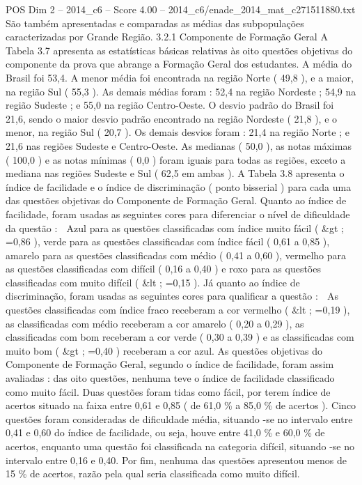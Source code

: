 \begin{textsample}{POS Dim 2 – 2014\_c6 – Score 4.00 – 2014\_c6/enade\_2014\_mat\_c271511880.txt}
São também apresentadas e comparadas as médias das subpopulações caracterizadas por Grande Região. 3.2.1 Componente de Formação Geral A Tabela 3.7 apresenta as estatísticas básicas relativas às oito questões objetivas do componente da prova que abrange a Formação Geral dos estudantes.
A média do Brasil foi 53,4.
A menor média foi encontrada na região Norte ( 49,8 ), e a maior, na região Sul ( 55,3 ).
As demais médias foram : 52,4 na região Nordeste ; 54,9 na região Sudeste ; e 55,0 na região Centro-Oeste.
O desvio padrão do Brasil foi 21,6, sendo o maior desvio padrão encontrado na região Nordeste ( 21,8 ), e o menor, na região Sul ( 20,7 ).
Os demais desvios foram : 21,4 na região Norte ; e 21,6 nas regiões Sudeste e Centro-Oeste.
As medianas ( 50,0 ), as notas máximas ( 100,0 ) e as notas mínimas ( 0,0 ) foram iguais para todas as regiões, exceto a mediana nas regiões Sudeste e Sul ( 62,5 em ambas ).
A Tabela 3.8 apresenta o índice de facilidade e o índice de discriminação ( ponto bisserial ) para cada uma das questões objetivas do Componente de Formação Geral.
Quanto ao índice de facilidade, foram usadas as seguintes cores para diferenciar o nível de dificuldade da questão :  Azul para as questões classificadas com índice muito fácil ( \&gt ; =0,86 ), verde para as questões classificadas com índice fácil ( 0,61 a 0,85 ), amarelo para as questões classificadas com médio ( 0,41 a 0,60 ), vermelho para as questões classificadas com difícil ( 0,16 a 0,40 ) e roxo para as questões classificadas com muito difícil ( \&lt ; =0,15 ).
Já quanto ao índice de discriminação, foram usadas as seguintes cores para qualificar a questão :  As questões classificadas com índice fraco receberam a cor vermelho ( \&lt ; =0,19 ), as classificadas com médio receberam a cor amarelo ( 0,20 a 0,29 ), as classificadas com bom receberam a cor verde ( 0,30 a 0,39 ) e as classificadas com muito bom ( \&gt ; =0,40 ) receberam a cor azul.
As questões objetivas do Componente de Formação Geral, segundo o índice de facilidade, foram assim avaliadas : das oito questões, nenhuma teve o índice de facilidade classificado como muito fácil.
Duas questões foram tidas como fácil, por terem índice de acertos situado na faixa entre 0,61 e 0,85 ( de 61,0 \% a 85,0 \% de acertos ).
Cinco questões foram consideradas de dificuldade média, situando -se no intervalo entre 0,41 e 0,60 do índice de facilidade, ou seja, houve entre 41,0 \% e 60,0 \% de acertos, enquanto uma questão foi classificada na categoria difícil, situando -se no intervalo entre 0,16 e 0,40.
Por fim, nenhuma das questões apresentou menos de 15 \% de acertos, razão pela qual seria classificada como muito difícil.

\end{textsample}
